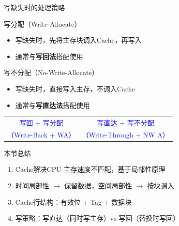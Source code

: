 \documentclass[10pt, aspectratio=169]{beamer}
\begin{document}
\begin{frame}{写缺失时的处理策略}
    \begin{block}{写分配（Write-Allocate）}
        \begin{itemize}
            \item 写缺失时，先将主存块调入Cache，再写入
            \item 通常与\textbf{写回法}搭配使用
        \end{itemize}
    \end{block}
    \begin{block}{写不分配（No-Write-Allocate）}
        \begin{itemize}
            \item 写缺失时，直接写入主存，不调入Cache
            \item 通常与\textbf{写直达法}搭配使用
        \end{itemize}
    \end{block}
    \vspace{0.5em}
    \begin{center}
        \begin{tabular}{c|c}
            \textcolor{blue}{写回 + 写分配} & \textcolor{blue}{写直达 + 写不分配} \\
            \textcolor{blue}{（Write-Back + WA）} & \textcolor{blue}{（Write-Through + NW A）}
        \end{tabular}
    \end{center}
\end{frame}

\begin{frame}{本节总结}
    \begin{enumerate}
        \item Cache解决CPU-主存速度不匹配，基于局部性原理
        \item 时间局部性 $\to$ 保留数据，空间局部性 $\to$ 按块调入
        \item Cache行结构：有效位 + Tag + 数据块
        \item 写策略：写直达（同时写主存）vs 写回（替换时写回）
    \end{enumerate}
\end{frame}
\end{document}
